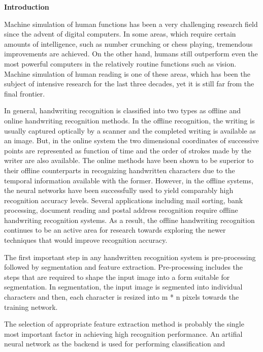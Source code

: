 \documentclass[main.tex]{subfiles}
\begin{document}
\begin{flushleft}
\Large{\bf{Introduction}}
\end{flushleft}
\vspace{1.5mm}
\justify
Machine simulation of human functions has been a very challenging research
field since the advent of digital computers. In some areas, which require
certain amounts of intelligence, such as number crunching or chess playing,
tremendous improvements are achieved. On the other hand, humans still outperform
even the most powerful computers in the relatively routine functions such as
vision. Machine simulation of human reading is one of these areas, which has
been the subject of intensive research for the last three decades, yet it is
still far from the final frontier.
\par In general, handwriting recognition is classified into two types as offline
and online handwriting recognition methods. In the offline recognition, the
writing is usually captured optically by a scanner and the completed writing is
available as an image. But, in the online system the two dimensional coordinates
of successive points are represented as function of time and the order of
strokes made by the writer are also available. The online methods have been
shown to be superior to their offline counterparts in recognizing handwritten
characters due to the temporal information available with the former. However,
in the offline systems, the neural networks have been successfully used to yield
comparably high recognition accuracy levels. Several applications including mail
sorting, bank processing, document reading and postal address recognition
require offline handwriting recognition systems. As a result, the offline
handwriting recognition continues to be an active area for research towards
exploring the newer techniques that would improve recognition accuracy.
\par The first important step in any handwritten recognition system is
pre-processing followed by segmentation and feature extraction. Pre-processing
includes the steps that are required to shape the input image into a form
suitable for segmentation. In segmentation, the input image is segmented into
individual characters and then, each character is resized into m * n pixels
towards the training network.
\par The selection of appropriate feature extraction method is probably the
single most important factor in achieving high recognition performance. An
artifial neural network as the backend is used for performing classification and
\end{document}
